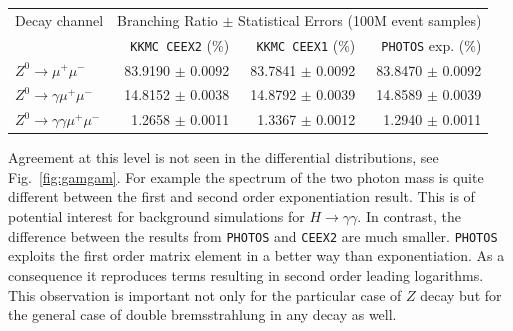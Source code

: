 \documentclass[]{Photos_interface_design}
\begin{document}
\begin{table}
\centering 
\begin{tabular}{lrrr} 
\toprule 
Decay channel &\multicolumn{3}{c}{ Branching Ratio $\pm$ Statistical Errors   (100M event samples)} \\ 
      & {\tt KKMC CEEX2} (\%) & {\tt KKMC CEEX1} (\%)& {\tt PHOTOS} exp. (\%)\\ 
\midrule
 {$Z^{0} \rightarrow \mu^{+} \mu^{-} $} & {83.9190 $\pm$  0.0092} &{  83.7841 $\pm$  0.0092} & 83.8470 $\pm$ 0.0092\\ 
 {$Z^{0} \rightarrow \gamma \mu^{+} \mu^{-} $} & {14.8152 $\pm$  0.0038} &{  14.8792 $\pm$  0.0039} & 14.8589 $\pm$ 0.0039 \\ 
{$Z^{0} \rightarrow \gamma \gamma \mu^{+} \mu^{-} $} & { 1.2658 $\pm$  0.0011} &{   1.3367 $\pm$  0.0012} & 1.2940 $\pm$ 0.0011\\ 
\bottomrule
\end{tabular}
\end{table}

Agreement at this level is not seen in the differential distributions, see Fig.~\ref{fig:gamgam}. For example the spectrum of 
the two photon mass is quite different between the first and second order 
exponentiation result. This is of potential interest for background simulations 
for $H \to \gamma \gamma$. In contrast, the difference between the results from {\tt PHOTOS} and {\tt CEEX2} are much smaller. {\tt PHOTOS} exploits the first order matrix element 
in a better way than exponentiation. As a consequence it reproduces terms resulting in second order leading logarithms. This observation is important not only for 
the particular case of $Z$ decay but for the general case of double bremsstrahlung in any decay as well.
\end{document}

